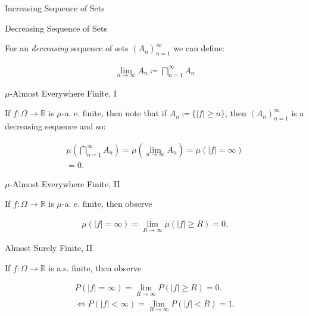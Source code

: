 \documentclass[10pt,landscape]{article}
\renewcommand{\geq}{\geqslant}
\begin{document}
\begin{multicols}{3}
\begin{observation}{}{Increasing Sequence of Sets}
\end{observation}

\begin{observation}{}{Decreasing Sequence of Sets}

    For an \emph{decreasing} sequence of sets $(A_n)_{n=1}^{\infty}$ we can define:

        \begin{align*}
            \lim_{n \to \infty} A_n \coloneqq \bigcap_{n=1}^{\infty} A_n
        \end{align*}

\end{observation}

\begin{observation}{}{$\mu$-Almost Everywhere Finite, I}

    If $f: \Omega \to \mathbb{R}$ is $\mu$-a. e. finite, then note that if $A_n \coloneqq \{ |f| \geq n \}$, then $(A_n)_{n=1}^{\infty}$ is a decreasing sequence and so:

        \begin{align*}
            \mu\left(\bigcap_{n=1}^{\infty} A_n\right) = \mu\left(\lim_{n \to \infty} A_n\right) = \mu(|f| = \infty) \\ = 0.
        \end{align*}

\end{observation}

\begin{observation}{}{$\mu$-Almost Everywhere Finite, II}

    If $f: \Omega \to \mathbb{R}$ is $\mu$-a. e. finite, then observe

        \begin{align*}
            \mu(|f| = \infty) = \lim_{R \to \infty} \mu(|f| \geq R) = 0.
        \end{align*}

\end{observation}

\begin{observation}{}{Almost Surely Finite, II}

    If $f: \Omega \to \mathbb{R}$ is a.s. finite, then observe

        \begin{align*}
            P(|f| = \infty) = \lim_{R \to \infty} P(|f| \geq R) = 0. \\
            \iff P(|f| < \infty) = \lim_{R \to \infty} P(|f| < R) = 1.
        \end{align*}


\end{observation}
\end{multicols}
\end{document}
